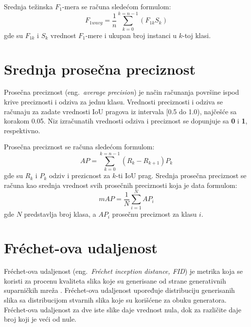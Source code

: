 \documentclass[12pt,oneside]{memoir}
\begin{document}
Srednja težinska $F_1$-mera se računa sledećom formulom:
\begin{equation}
\label{eq:f1wa}
    F_{1wavg} = \frac{1}{n}\sum_{k=0}^{k=n-1} (F_{1k} S_{k})
\end{equation}
gde su \(F_{1k}\) i \(S_{k}\) vrednost $F_1$-mere i ukupan broj instanci u \(k\)-toj klasi.

\section{Srednja prosečna preciznost}
\label{section4_avgprecision}

Prosečna preciznost (eng.~\textit{average precision}) je način računanja površine ispod krive preciznosti i odziva za jednu klasu. Vrednosti preciznosti i odziva se računaju za zadate vrednosti IoU pragova iz intervala [0.5 do 1.0), najčešće sa korakom 0.05.
Niz izračunatih vrednosti odziva i preciznost se dopunjuje sa \textbf{0} i \textbf{1}, respektivno. 


Prosečna preciznost se računa sledećom formulom:
\begin{equation}
\label{eq:ap}
    AP = \sum_{k=0}^{k=n-1} (R_{k} - R_{k+1})P_{k}
\end{equation}
gde su \(R_{k}\) i \(P_{k}\) odziv i prezicnost za \(k\)-ti IoU prag.
Srednja prosečna preciznost se računa kao srednja vrednost svih prosečnih preciznosti koja je data formulom:
\begin{equation}
\label{eq:map}
    mAP =\frac{1}{N} \sum_{i=1}^{N} AP_{i}
\end{equation}
gde \(N\) predstavlja broj klasa, a \(AP_{i}\) prosečnu preciznost za klasu 
\(i\).

\section{Fréchet-ova udaljenost}

Fréchet-ova udaljenost (eng.~\textit{Fréchet inception distance, FID}) je metrika koja se koristi za procenu kvaliteta slika koje su generisane od strane generativnih suparničkih mreža \cite{heusel2017gans}. Fréchet-ova udaljenost upoređuje distribuciju generisanih slika sa distribucijom stvarnih slika koje su korišćene za obuku generatora. Fréchet-ova udaljenost za dve iste slike daje vrednost nula, dok za različite daje broj koji je veći od nule.  
\end{document}
